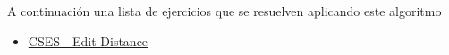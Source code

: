 A continuación una lista de ejercicios que se resuelven aplicando este algoritmo 

\begin{itemize}
	\item \href{https://cses.fi/problemset/task/1639/}{CSES - Edit Distance}
\end{itemize}